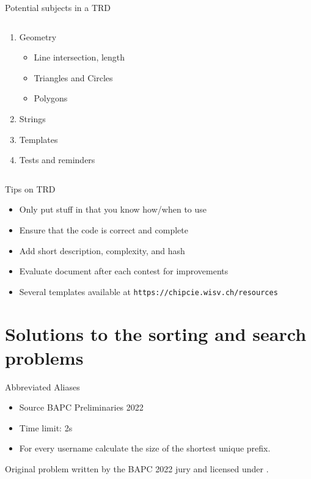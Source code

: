 \documentclass[11pt,pdf, aspectratio=169]{beamer}
\begin{document}
\begin{frame}{Potential subjects in a TRD}
\begin{columns}
\begin{column}{.45\textwidth}
\begin{enumerate}
\begin{itemize}
          \end{itemize}
          \item Geometry
          \begin{itemize}
            \item Line intersection, length
            \item Triangles and Circles
            \item Polygons
          \end{itemize}
          \item Strings
          \item Templates
          \item Tests and reminders
        \end{enumerate}
      \end{column}
    \end{columns}
  \end{frame}
  \begin{frame}{Tips on TRD}
    \begin{itemize}
      \item Only put stuff in that you know how/when to use
      \item Ensure that the code is correct and complete
      \item Add short description, complexity, and hash
      \item Evaluate document after each contest for improvements
      \item Several templates available at \texttt{https://chipcie.wisv.ch/resources}
    \end{itemize}
  \end{frame}


  \section{Solutions to the sorting and search problems}
  \begin{frame}{Abbreviated Aliases}
    \begin{itemize}
      \item Source BAPC Preliminaries 2022
      \item Time limit: 2s
      \item For every username calculate the size of the shortest unique prefix.
    \end{itemize}
    Original problem written by the BAPC 2022 jury and licensed under \doclicenseLongNameRef.

    \doclicenseImage
  \end{frame}
\end{document}
